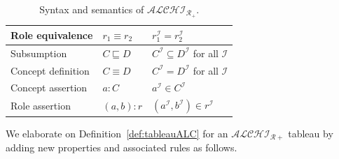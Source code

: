 \documentclass{article}
\begin{document}
\begin{center}
\begin{table}[H]
\begin{tabular}{|p{4cm} | p{2cm} | p{10cm}| }
    Role equivalence & $r_1\equiv r_2$ & $r_1^\mathcal{I} = r_2^\mathcal{I}$\\    \hline
    Subsumption & $C\sqsubseteq D$ & $C^\mathcal{I}\subseteq D^\mathcal{I}$ for all $\mathcal{I}$\\
    Concept definition & $C\equiv D$ & $C^\mathcal{I}= D^\mathcal{I}$ for all $\mathcal{I}$\\ \hline
    Concept assertion & $a:C$ & $a^\mathcal{I}\in C^\mathcal{I}$ \\
    Role assertion & $(a,b):r$ & $(a^\mathcal{I},b^\mathcal{I})\in r^\mathcal{I}$ \\ \hline
    \end{tabular}
    \caption{Syntax and semantics of $\mathcal{ALCHI_{R_+}}$.}
    \label{tab:alchir_interpretation}
\end{table}
\end{center} 
We elaborate on Definition~\ref{def:tableauALC} for an $\mathcal{ALCHI_{R+}}$ tableau by adding new properties and associated rules as follows.
\end{document}
